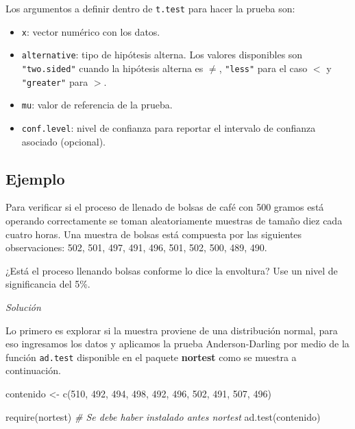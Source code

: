 \documentclass[
]{book}
\makeatletter
\newenvironment{Shaded}{\begin{snugshade}}{\end{snugshade}}
\newcommand{\CommentTok}[1]{\textcolor[rgb]{0.56,0.35,0.01}{\textit{#1}}}
\newcommand{\DecValTok}[1]{\textcolor[rgb]{0.00,0.00,0.81}{#1}}
\newcommand{\FunctionTok}[1]{\textcolor[rgb]{0.00,0.00,0.00}{#1}}
\newcommand{\NormalTok}[1]{#1}
\newcommand{\OtherTok}[1]{\textcolor[rgb]{0.56,0.35,0.01}{#1}}
\providecommand{\tightlist}{%
  \setlength{\itemsep}{0pt}\setlength{\parskip}{0pt}}
\newenvironment{kframe}{%
\medskip{}
\setlength{\fboxsep}{.8em}
 \def\at@end@of@kframe{}%
 \ifinner\ifhmode%
  \def\at@end@of@kframe{\end{minipage}}%
  \begin{minipage}{\columnwidth}%
 \fi\fi%
 \def\FrameCommand##1{\hskip\@totalleftmargin \hskip-\fboxsep
 \colorbox{shadecolor}{##1}\hskip-\fboxsep
     \hskip-\linewidth \hskip-\@totalleftmargin \hskip\columnwidth}%
 \MakeFramed {\advance\hsize-\width
   \@totalleftmargin\z@ \linewidth\hsize
   \@setminipage}}%
 {\par\unskip\endMakeFramed%
 \at@end@of@kframe}
\renewenvironment{Shaded}{\begin{kframe}}{\end{kframe}}
\makeatother
\begin{document}
Los argumentos a definir dentro de \texttt{t.test} para hacer la prueba son:

\begin{itemize}
\tightlist
\item
  \texttt{x}: vector numérico con los datos.
\item
  \texttt{alternative}: tipo de hipótesis alterna. Los valores disponibles son \texttt{"two.sided"} cuando la hipótesis alterna es \(\neq\), \texttt{"less"} para el caso \(<\) y \texttt{"greater"} para \(>\).
\item
  \texttt{mu}: valor de referencia de la prueba.
\item
  \texttt{conf.level}: nivel de confianza para reportar el intervalo de confianza asociado (opcional).
\end{itemize}

\hypertarget{ejemplo-63}{%
\subsection*{Ejemplo}\label{ejemplo-63}}

Para verificar si el proceso de llenado de bolsas de café con 500 gramos está operando correctamente se toman aleatoriamente muestras de tamaño diez cada cuatro horas. Una muestra de bolsas está compuesta por las siguientes observaciones: 502, 501, 497, 491, 496, 501, 502, 500, 489, 490.

¿Está el proceso llenando bolsas conforme lo dice la envoltura? Use un nivel de significancia del 5\%.

\emph{Solución}

Lo primero es explorar si la muestra proviene de una distribución normal, para eso ingresamos los datos y aplicamos la prueba Anderson-Darling por medio de la función \texttt{ad.test} disponible en el paquete \textbf{nortest} \citep{R-nortest} como se muestra a continuación.

\begin{Shaded}
\begin{Highlighting}[]
\NormalTok{contenido }\OtherTok{\textless{}{-}} \FunctionTok{c}\NormalTok{(}\DecValTok{510}\NormalTok{, }\DecValTok{492}\NormalTok{, }\DecValTok{494}\NormalTok{, }\DecValTok{498}\NormalTok{, }\DecValTok{492}\NormalTok{,}
               \DecValTok{496}\NormalTok{, }\DecValTok{502}\NormalTok{, }\DecValTok{491}\NormalTok{, }\DecValTok{507}\NormalTok{, }\DecValTok{496}\NormalTok{) }

\FunctionTok{require}\NormalTok{(nortest) }\CommentTok{\# Se debe haber instalado antes nortest}
\FunctionTok{ad.test}\NormalTok{(contenido)}
\end{Highlighting}
\end{Shaded}
\end{document}
